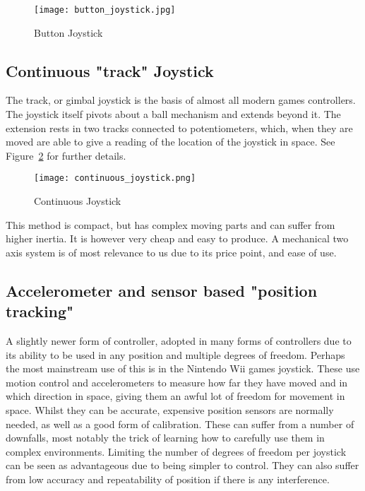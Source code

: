 \begin{figure}
  \centering
  \texttt{[image: button\_joystick.jpg]}
  \caption{Button Joystick}
  \label{fig:button_joystick}
\end{figure}


\subsection{Continuous "track" Joystick} %
\label{sub:continuous_joystick}

The track, or gimbal joystick is the basis of almost all modern games controllers. The joystick itself pivots about a ball mechanism and extends beyond it. The extension rests in two tracks connected to potentiometers, which, when they are moved are able to give a reading of the location of the joystick in space. See Figure~\ref{fig:continuous_joystick} for further details.

\begin{figure}
  \centering
  \texttt{[image: continuous\_joystick.png]}
  \caption{Continuous Joystick}
  \label{fig:continuous_joystick}
\end{figure}

This method is compact, but has complex moving parts and can suffer from higher inertia. It is however very cheap and easy to produce. A mechanical two axis system is of most relevance to us due to its price point, and ease of use.


\subsection{Accelerometer and sensor based "position tracking"} %
\label{sub:accelerometer_and_sensor_based}

A slightly newer form of controller, adopted in many forms of controllers due to its ability to be used in any position and multiple degrees of freedom. Perhaps the most mainstream use of this is in the Nintendo Wii games joystick. These use motion control and accelerometers to measure how far they have moved and in which direction in space, giving them an awful lot of freedom for movement in space. Whilst they can be accurate, expensive position sensors are normally needed, as well as a good form of calibration. These can suffer from a number of downfalls, most notably the trick of learning how to carefully use them in complex environments. Limiting the number of degrees of freedom per joystick can be seen as advantageous due to being simpler to control. They can also suffer from low accuracy and repeatability of position if there is any interference.


